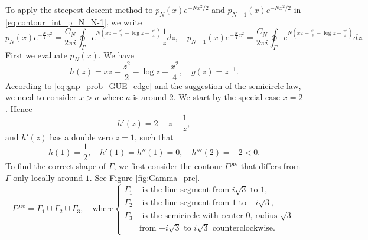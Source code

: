 \documentclass[11pt, a4paper]{article}
\numberwithin{equation}{section}
\DeclareMathOperator{\pre}{pre}
\theoremstyle{definition}
\theoremstyle{remark}
\begin{document}
To apply the steepest-descent method to $p_N(x) e^{-Nx^2/2}$ and $p_{N - 1}(x) e^{-Nx^2/2}$ in \eqref{eq:contour_int_p_N_N-1}, we write
\begin{equation} \label{eq:contour_int_p_N_N-1}
  p_N(x) e^{-\frac{N}{4}x^2} = \frac{C_N}{2\pi i} \oint_{\Gamma} e^{N(xz - \frac{z^2}{2} - \log z - \frac{x^2}{4})} \frac{1}{z} dz, \quad p_{N - 1}(x) e^{-\frac{N}{4}x^2} = \frac{C_N}{2\pi i} \oint_{\Gamma} e^{N(xz - \frac{z^2}{2} - \log z - \frac{x^2}{4})} dz.
\end{equation}
First we evaluate $p_N(x)$. We have
\begin{equation}
  h(z) = xz - \frac{z^2}{2} - \log z - \frac{x^2}{4}, \quad g(z) = z^{-1}.
\end{equation}
According to \eqref{eq:gap_prob_GUE_edge} and the suggestion of the semicircle law, we need to consider $x > a$ where $a$ is around $2$. We start by the special case $x = 2$. Hence
\begin{equation}
  h'(z) = 2 - z - \frac{1}{z},
\end{equation}
and $h'(z)$ has a double zero $z = 1$, such that
\begin{equation}
  h(1) = \frac{1}{2}, \quad h'(1) = h''(1) = 0, \quad h'''(2) = -2 < 0.
\end{equation}
To find the correct shape of $\Gamma$, we first consider the contour $\Gamma^{\pre}$ that differs from $\Gamma$ only locally around $1$. See Figure \ref{fig:Gamma_pre}.
\begin{equation}
  \Gamma^{\pre} = \Gamma_1 \cup \Gamma_2 \cup \Gamma_3, \quad \text{where}
  \left\{
    \begin{aligned}
      \Gamma_1 & \text{ is the line segment from $i\sqrt{3}$ to $1$,} \\
      \Gamma_2 & \text{ is the line segment from $1$ to $-i\sqrt{3}$,} \\
      \Gamma_3 & \text{ is the semicircle with center $0$, radius $\sqrt{3}$} \\
      & \text{from $-i\sqrt{3}$ to $i\sqrt{3}$ counterclockwise.}
    \end{aligned}
  \right.
\end{equation}
\end{document}
